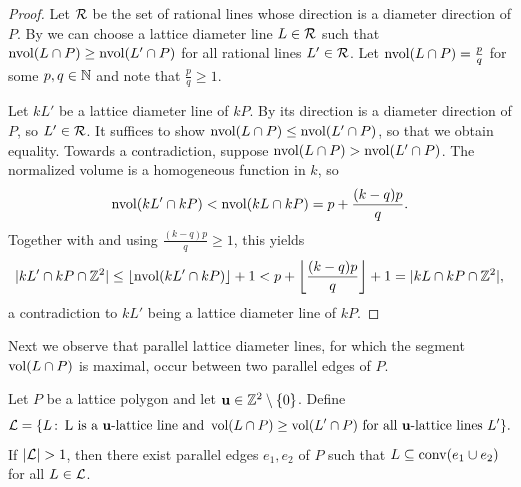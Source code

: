 \begin{proof}
    Let $\mathcal{R}$ be the set of rational lines whose direction is a diameter direction of $P$.
    By  we can choose a lattice diameter line $L \in \mathcal{R}$ such that $\operatorname{nvol}(L \cap P) \geq \operatorname{nvol}(L' \cap P)$ for all rational lines $L' \in \mathcal{R}$. Let $\operatorname{nvol}(L \cap P)=\frac{p}{q}$ for some $p,q \in \mathbb{N}$ and note that $\frac{p}{q} \geq 1$.

    Let $kL'$ be a lattice diameter line of $kP$. By  its direction is a diameter direction of $P$, so $L' \in \mathcal{R}$. It suffices to show $\operatorname{nvol}(L \cap P) \leq \operatorname{nvol}(L' \cap P)$, so that we obtain equality. Towards a contradiction, suppose  $\operatorname{nvol}(L \cap P) > \operatorname{nvol}(L' \cap P)$. The normalized volume is a homogeneous function in $k$, so 
    \begin{align*}
        \operatorname{nvol}(kL' \cap kP) < \operatorname{nvol}(kL \cap kP) = p + \frac{(k-q)p}{q}.
    \end{align*}
    Together with  and using $\frac{(k-q)p}{q}\geq 1$, this yields
    \begin{align*}
        |kL' \cap kP \cap \mathbb{Z}^2| \leq \lfloor \operatorname{nvol}(kL' \cap kP)\rfloor +1 < p  + \left\lfloor \frac{(k-q)p}{q}\right\rfloor +1 = |kL \cap kP \cap \mathbb{Z}^2|,
    \end{align*}
    a contradiction to $kL'$ being a lattice diameter line of $kP$.
\end{proof}

Next we observe that parallel lattice diameter lines, for which the segment $\operatorname{vol}(L \cap P)$ is maximal, occur between two parallel edges of $P$.

\begin{lemma}\label{lemma:LD-in-chambers}
    Let $P$ be a lattice polygon and let $\mathbf{u} \in \mathbb{Z}^2 \setminus \{0\}$. Define
    \[
    \mathcal{L} = \{ L \, \mathrm{:}\, \text{ L is a $\mathbf{u}$-lattice line and } \operatorname{vol}(L \cap P) \geq \operatorname{vol}(L' \cap P) \text{ for all $\mathbf{u}$-lattice lines $L'$}\}.
    \]
    If $|\Lcal|>1$, then there exist parallel edges $e_1,e_2$ of $P$ such that $L \subseteq \operatorname{conv}(e_ 1 \cup e_2)$ for all $L \in \mathcal{L}$.
\end{lemma}

